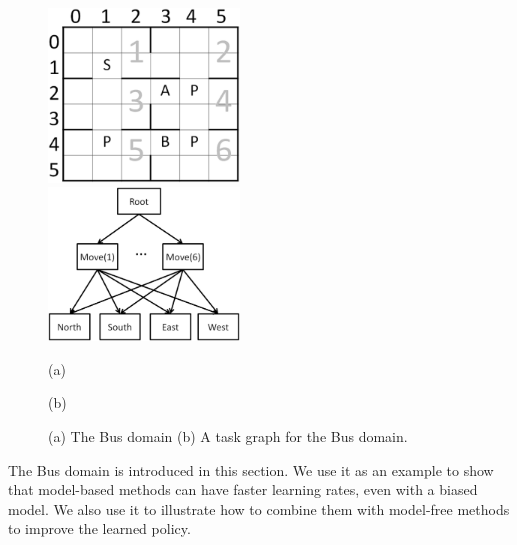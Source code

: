 \begin{figure}[t]
 \begin{minipage}[b]{0.5\linewidth}
    \begin{center}
    \includegraphics[width=2.0in] {./figures/BusSmall.eps}
\end{center}
\end{minipage}
\begin{minipage}[b]{0.5\linewidth}
    \begin{center}
    \includegraphics[width=2.0in] {./figures/BusHierarchy.eps}
\end{center}
\end{minipage}
\begin{minipage}[b]{0.5\linewidth} \centering (a) \end{minipage}
\begin{minipage}[b]{0.5\linewidth} \centering (b) \end{minipage}

\caption{(a) The Bus domain (b) A task graph for the Bus domain.}
\label{fig:bus}
\end{figure}

The Bus domain is introduced in this section. We use it as an example to show 
that model-based methods can have faster learning rates, even with a biased model.
We also use it to illustrate how to combine them with model-free methods to improve the learned policy.


